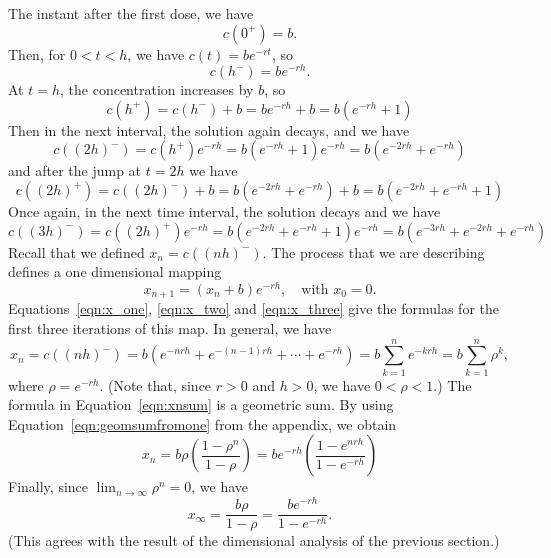 \documentclass[reqno]{immbook}
\newcommand{\ds}{\displaystyle}
\numberwithin{equation}{chapter}
\numberwithin{question}{section}
\numberwithin{theorem}{chapter}
\numberwithin{figure}{chapter}
\theoremstyle{definition}
\begin{document}
The instant after the first dose, we have
\begin{equation}
  c(0^{+}) = b.
\end{equation}
Then, for $0 < t < h$, we have $c(t) = be^{-rt}$, so
\begin{equation}
  c(h^{-}) = be^{-rh}.
\label{eqn:x_one}
\end{equation}
At $t=h$, the concentration increases by $b$, so
\begin{equation}
  c(h^{+}) = c(h^{-})+b = be^{-rh} + b = b\left(e^{-rh}+1\right)
\end{equation}
Then in the next interval, the solution again decays, and we have
\begin{equation}
  c((2h)^{-}) = c(h^{+})e^{-rh} = b\left(e^{-rh}+1\right) e^{-rh}
     = b\left(e^{-2rh} + e^{-rh}\right)
\label{eqn:x_two}
\end{equation}
and after the jump at $t=2h$ we have
\begin{equation}
  c((2h)^{+}) = c((2h)^{-})+b = b\left(e^{-2rh}+e^{-rh}\right) + b
     = b\left( e^{-2rh} + e^{-rh}+1\right)
\end{equation}
Once again, in the next time interval, the solution decays and we have
\begin{equation}
  c((3h)^{-}) = c((2h)^{+})e^{-rh} = b\left( e^{-2rh} + e^{-rh}+1\right)e^{-rh}
    = b\left( e^{-3rh} + e^{-2rh}+e^{-rh}\right)
\label{eqn:x_three}
\end{equation}
Recall that we defined $x_n = c((nh)^{-})$.
The process that we are describing defines a one dimensional mapping
\begin{equation}
   x_{n+1} = (x_n+b)e^{-rh}, \quad \textrm{with $x_0=0$.}
\end{equation}
Equations~\eqref{eqn:x_one}, \eqref{eqn:x_two} and
\eqref{eqn:x_three} give the formulas for the first three
iterations of this map.
In general, we have
\begin{equation}
  x_n = c((nh)^{-}) = b\left( e^{-nrh} + e^{-(n-1)rh} + \cdots + e^{-rh}\right)
        = b \sum_{k=1}^{n} e^{-krh}
	= b \sum_{k=1}^{n} \rho^k,
\label{eqn:xnsum}
\end{equation}
where $\rho = e^{-rh}$.
(Note that, since $r>0$ and $h>0$, we have $0 < \rho < 1$.)
The formula in Equation~\eqref{eqn:xnsum} is a geometric sum.
By using Equation~\eqref{eqn:geomsumfromone} from the
appendix, we obtain
\begin{equation}
  x_n = b \rho\left(\frac{1-\rho^n}{1-\rho}\right)
      = be^{-rh}\left(\frac{1-e^{nrh}}{1-e^{-rh}}\right)
\end{equation}
Finally, since $\ds \lim_{n\rightarrow\infty} \rho^n = 0$, we have
\begin{equation}
  x_{\infty} = \frac{b\rho}{1-\rho}
     = \frac{be^{-rh}}{1-e^{-rh}}. 
\end{equation}
(This agrees with the result of the
dimensional analysis of the previous section.)
\end{document}
